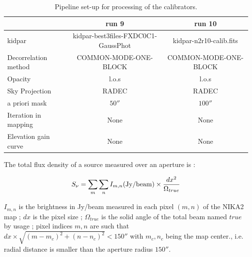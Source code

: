 \begin{table}[h]
\begin{center}
\begin{tabular}{|l|c|c|}
\hline
                      &    run 9                             &  run  10                   \\
\hline
kidpar                &  {\scriptsize kidpar-best3files-FXDC0C1-GaussPhot} &  {\scriptsize kidpar-n2r10-calib.fits}   \\
Decorrelation method  &  {\scriptsize COMMON-MODE-ONE-BLOCK} &    {\scriptsize COMMON-MODE-ONE-BLOCK}    \\
Opacity               &  {\scriptsize  l.o.s}                &  {\scriptsize l.o.s}     \\
Sky Projection        &  {\scriptsize RADEC}                  &  {\scriptsize RADEC}     \\
a priori mask         &  {\scriptsize   $50''$}              &  {\scriptsize $100''$}  \\
Iteration in mapping  &  {\scriptsize  None}                 &  {\scriptsize None}     \\
Elevation gain curve  &  {\scriptsize  None}                 &  {\scriptsize None}      \\
\hline
\end{tabular}
\caption[]{Pipeline set-up for processing of the calibrators.}
\label{tab:Pipe}
\end{center}
\end{table}

The total flux density of a source  measured over an aperture  is :

\begin{equation}
S_{\nu} = \sum_{m} \sum_{n}  I_{m,n} ({\rm Jy/beam}) \times {dx^2 \over {\Omega_{true}}}
\label{eq:ApPh}
\end{equation}


\noindent  $I_{m,n}$ is the brightness in Jy/beam measured in each
pixel $(m,n)$ of the NIKA2 map ; $dx$ is the pixel size ;
$\Omega_{true}$ is the solid angle of the total beam named $true$ by usage ; pixel
indices $m,n$ are such that $dx \times \sqrt{(m-m_c)^2 + (n-n_c)^2} < 150''$ with 
$m_c,n_c$ being the map center., i.e. radial distance is smaller than the aperture radius $150''$.

